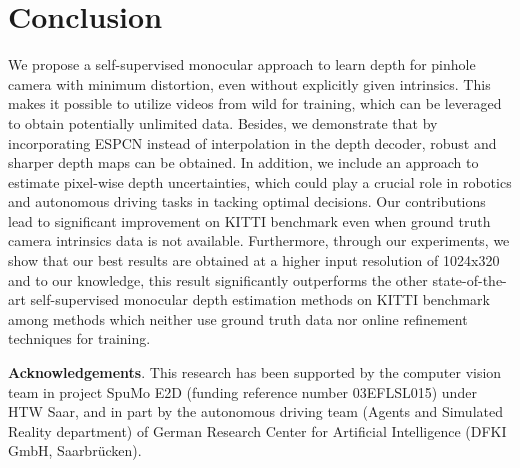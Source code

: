 \documentclass{bmvc2k}
\begin{document}
\section{Conclusion}
\label{sec:concl}
\vspace{-2mm}
We propose a self-supervised monocular approach to learn depth for pinhole camera with minimum distortion, even without explicitly given intrinsics. This makes it possible to utilize videos from wild for training, which can be leveraged to obtain potentially unlimited data. Besides, we demonstrate that by incorporating ESPCN instead of interpolation in the depth decoder, robust and sharper depth maps can be obtained. In addition, we include an approach to estimate pixel-wise depth uncertainties, which could play a crucial role in robotics and autonomous driving tasks in tacking optimal decisions. Our contributions lead to significant improvement on KITTI benchmark even when ground truth camera intrinsics data is not available. Furthermore, through our experiments, we show that our best results are obtained at a higher input resolution of 1024x320 and to our knowledge, this result significantly outperforms the other state-of-the-art self-supervised monocular depth estimation methods on KITTI benchmark among methods which neither use ground truth data nor online refinement techniques for training.

\textbf{Acknowledgements}. This research has been supported by the computer vision team in project SpuMo E2D (funding reference number 03EFLSL015) under HTW Saar, and in part by the autonomous driving team (Agents and Simulated Reality department) of German Research Center for Artificial Intelligence (DFKI GmbH, Saarbrücken).




\end{document}
